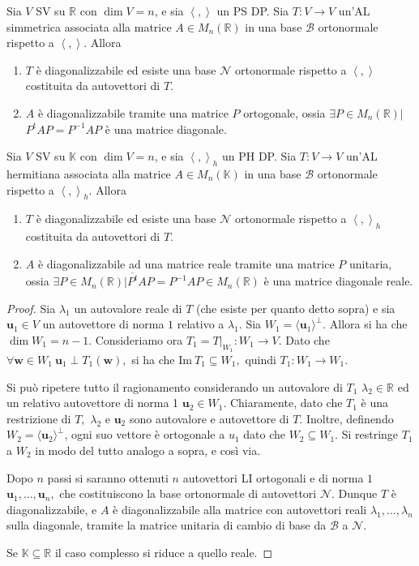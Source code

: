 \documentclass[]{article}
\newcommand{\vu}{\mathbf{u}}
\newcommand{\vw}{\mathbf{w}}
\newcommand{\scalprod}[2]{\left\langle #1 , #2 \right\rangle}
\theoremstyle{definition}
\theoremstyle{definition}
\theoremstyle{definition}
\begin{document}
\begin{thm}  Sia $V$ SV su $\mathbb{R}$ con $\dim V=n$, e sia $\scalprod{}{}$ un PS DP. Sia $T:V \to V$ un'AL simmetrica associata alla matrice $A \in M_n(\mathbb{R})$ in una base $\mathcal{B}$ ortonormale rispetto a $\scalprod{}{}$. Allora
\begin{enumerate}
	\item $T$ è diagonalizzabile ed esiste una base $\mathcal{N}$ ortonormale rispetto a $\scalprod{}{}$ costituita da autovettori di $T$.
	\item $A$ è diagonalizzabile tramite una matrice $P$ ortogonale, ossia $\exists P \in M_n (\mathbb{R}) |$ $P^t AP = P^{-1} AP$ è una matrice diagonale.
\end{enumerate}

\end{thm} \begin{thm} Sia $V$ SV su $\mathbb{K}$ con $\dim V=n$, e sia $\scalprod{}{}_h$ un PH DP. Sia $T:V \to V$ un'AL hermitiana associata alla matrice $A \in M_n(\mathbb{K})$ in una base $\mathcal{B}$ ortonormale rispetto a $\scalprod{}{}_h$. Allora
\begin{enumerate}
	\item $T$ è diagonalizzabile ed esiste una base $\mathcal{N}$ ortonormale rispetto a $\scalprod{}{}_h$ costituita da autovettori di $T$.
	\item $A$ è diagonalizzabile ad una matrice reale tramite una matrice $P$ unitaria, ossia $\exists P \in M_n (\mathbb{R}) | \overline{P^t} AP = P^{-1} AP \in M_n(\mathbb{R})$ è una matrice diagonale reale.
\end{enumerate}
\end{thm} 
\begin{proof}
Sia $\lambda_1$ un autovalore reale di $T$ (che esiste per quanto detto sopra) e sia $\vu_1 \in V$ un autovettore di norma $1$ relativo a $\lambda_1$. Sia $W_1=\langle \vu_1 \rangle^{\perp}$. Allora si ha che $\dim W_1 =n-1.$ Consideriamo ora $T_1=T|_{W_1}:W_1 \to V.$ Dato che $\forall \vw \in W_1\ \vu_1 \perp T_1(\vw),$ si ha che $\mathrm{Im}\ T_1 \subseteq W_1,$ quindi $T_1:W_1 \to W_1.$ 

Si può ripetere tutto il ragionamento considerando un autovalore di $T_1$ $\lambda_2 \in \mathbb{R}$ ed un relativo autovettore di norma 1 $\vu_2 \in W_1$. Chiaramente, dato che $T_1$ è una restrizione di $T,$ $\lambda_2$ e $\vu_2$ sono autovalore e autovettore di $T$. Inoltre, definendo $W_2=\langle \vu_2 \rangle^{\perp}$, ogni suo vettore è ortogonale a $u_1$ dato che $W_2 \subseteq W_1$. Si restringe $T_1$ a $W_2$ in modo del tutto analogo a sopra, e così via.

Dopo $n$ passi si saranno ottenuti $n$ autovettori LI ortogonali e di norma $1$ $\vu_1,...,\vu_n,$ che costituiscono la base ortonormale di autovettori $\mathcal{N}.$ Dunque $T$ è diagonalizzabile, e $A$ è diagonalizzabile alla matrice con autovettori reali $\lambda_1,...,\lambda_n$ sulla diagonale, tramite la matrice unitaria di cambio di base da $\mathcal{B}$ a $\mathcal{N}.$

Se $\mathbb{K} \subseteq \mathbb{R}$ il caso complesso si riduce a quello reale.
\end{proof}
\end{document}
